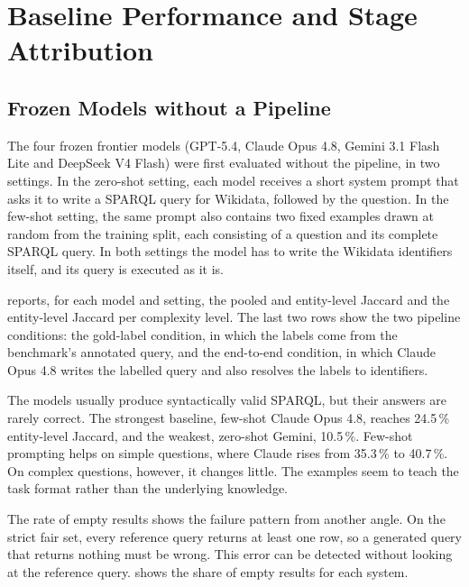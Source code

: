 

\section{Baseline Performance and Stage
Attribution}

\subsection{Frozen Models without a
Pipeline}

\label{sec:res-frozen}

The four frozen frontier models (GPT-5.4, Claude Opus 4.8, Gemini 3.1 Flash Lite and DeepSeek V4 Flash) were first evaluated without the pipeline, in two settings.
In the zero-shot setting, each model receives a short system prompt that asks it to write a SPARQL query for Wikidata, followed by the question.
In the few-shot setting, the same prompt also contains two fixed examples drawn at random from the training split, each consisting of a question and its complete SPARQL query.
In both settings the model has to write the Wikidata identifiers itself, and its query is executed as it is.



 reports, for each model and setting, the pooled and entity-level Jaccard and the entity-level Jaccard per complexity level.
The last two rows show the two pipeline conditions: the gold-label condition, in which the labels come from the benchmark's annotated query, and the end-to-end condition, in which Claude Opus 4.8 writes the labelled query and also resolves the labels to identifiers.

The models usually produce syntactically valid SPARQL, but their answers are rarely correct.
The strongest baseline, few-shot Claude Opus 4.8, reaches 24.5\,\% entity-level Jaccard, and the weakest, zero-shot Gemini, 10.5\,\%.
Few-shot prompting helps on simple questions, where Claude rises from 35.3\,\% to 40.7\,\%.
On complex questions, however, it changes little.
The examples seem to teach the task format rather than the underlying knowledge.

The rate of empty results shows the failure pattern from another angle.
On the strict fair set, every reference query returns at least one row, so a generated query that returns nothing must be wrong.
This error can be detected without looking at the reference query.
 shows the share of empty results for each system.

